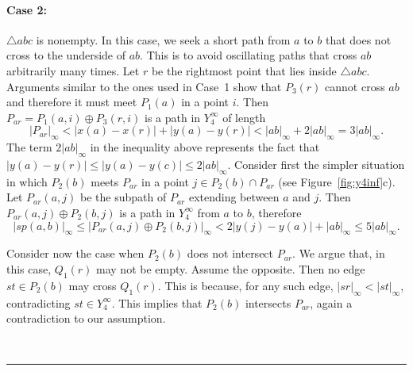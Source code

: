\pdfoutput=1  \documentclass[11pt]{article}
\newcommand{\qed}{\rule{0.5em}{1.5ex}}
\newcommand{\fqed}{{\hfill~\qed}}
\newenvironment{proof}{{\noindent \bf Proof.}}
                      {{\hfill \fqed} \vspace{1em}}
\begin{document}
\begin{proof}
\paragraph{Case 2: } $\triangle abc$ is nonempty.
In this case, we seek a short path from $a$ to $b$ that does not
cross to the underside of $ab$. This is to avoid oscillating paths
that cross $ab$ arbitrarily many times. Let $r$ be the rightmost point
that lies inside $\triangle abc$. Arguments similar to the ones used in Case~1 show that
$P_3(r)$ cannot cross $ab$ and therefore it must meet $P_1(a)$ in a point $i$. Then
$P_{ar} = P_1(a, i) \oplus P_3(r, i)$ is a path in $Y_4^\infty$ of length
\begin{equation}
|P_{ar}|_\infty < |x(a)-x(r)| + |y(a)-y(r)| < |ab|_\infty + 2|ab|_\infty = 3|ab|_\infty.
\label{eq:par}
\end{equation}
The term $2|ab|_\infty$ in the inequality above represents the fact that
$|y(a) - y(r)| \le |y(a) - y(c)| \le 2|ab|_\infty$.
Consider first the simpler situation in which $P_2(b)$ meets $P_{ar}$ in a
point $j \in P_2(b) \cap P_{ar}$ (see Figure~\ref{fig:y4inf}c).
Let $P_{ar}(a, j)$ be the subpath of $P_{ar}$ extending between $a$ and $j$.
Then $P_{ar}(a, j) \oplus P_2(b,j)$ is a path in $Y_4^\infty$ from $a$ to $b$,
therefore
\[
|sp(a,b)|_\infty \le |P_{ar}(a, j) \oplus P_2(b, j)|_\infty <
2 |y(j)-y(a)| + |ab|_\infty \le 5|ab|_\infty.
\]

Consider now the case when $P_2(b)$ does not intersect $P_{ar}$. We argue that, in this
case, $Q_1(r)$ may not be empty. Assume the opposite. Then
no edge $st \in P_2(b)$ may cross $Q_1(r)$. This is because,
for any such edge, $|sr|_\infty < |st|_\infty$, contradicting
$st \in Y_4^\infty$. This implies that $P_2(b)$ intersects $P_{ar}$, again
a contradiction to our assumption.


\end{proof}
\end{document}
